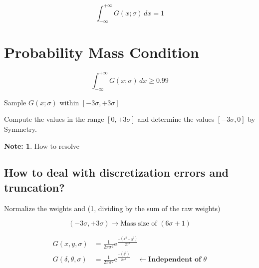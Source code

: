 \documentclass[11pt]{article}
\theoremstyle{definition}
\newtheorem*{myunnote}{Note:} %
\begin{document}
\[
\int_{-\infty}^{+\infty} G(x; \sigma)\, dx = 1
\]

\section*{Probability Mass Condition}

\[
\int_{-\infty}^{+\infty} G(x; \sigma)\, dx \ge 0.99
\]

Sample $G(x; \sigma)$ within $[-3\sigma, +3\sigma]$

Compute the values in the range $[0, +3\sigma]$ and determine the values $[-3\sigma, 0]$ by Symmetry.


\begin{myunnote}
    How to resolve 

\end{myunnote}

\subsection*{How to deal with discretization errors and truncation?}

Normalize the weights and (1, dividing by the sum of the raw weights)

\[(-3\sigma, +3 \sigma) \longrightarrow \text{Mass size of }(6\sigma+1)\]



\newpage
\pagestyle{fancy}  %
\begin{equation}
\begin{aligned}
G(x, y, \sigma) &= \frac{1}{2\pi\sigma^2}\mathrm{e}^{\frac{-(x^2+y^2)}{2\sigma^2}} \\
G(\delta, \theta, \sigma) &= \frac{1}{2\pi\sigma^2}\mathrm{e}^{\frac{-(\delta^2)}{2\sigma^2}}
\quad \longleftarrow \textbf{Independent of }\theta
\end{aligned}
\end{equation}
\end{document}
